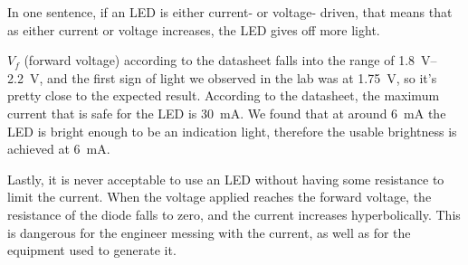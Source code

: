 \documentclass{article}
\begin{document}
In one sentence, if an LED is either current- or voltage-
driven, that means that as either current or voltage
increases, the LED gives off more light.

\(V_f\) (forward voltage) according to the datasheet falls into
the range of \SI{1.8}{V}--\SI{2.2}{V}, and the first sign of
light we observed in the lab was at \SI{1.75}{V}, so it's
pretty close to the expected result. According to the datasheet,
the maximum current that is safe for the LED is \SI{30}{mA}.
We found that at around \SI{6}{mA} the LED is bright enough
to be an indication light, therefore the usable brightness
is achieved at \SI{6}{mA}.

Lastly, it is never acceptable to use an LED without having
some resistance to limit the current. When the voltage applied
reaches the forward voltage, the resistance of the diode falls
to zero, and the current increases hyperbolically. This is
dangerous for the engineer messing with the current, as well as
for the equipment used to generate it.
\end{document}
